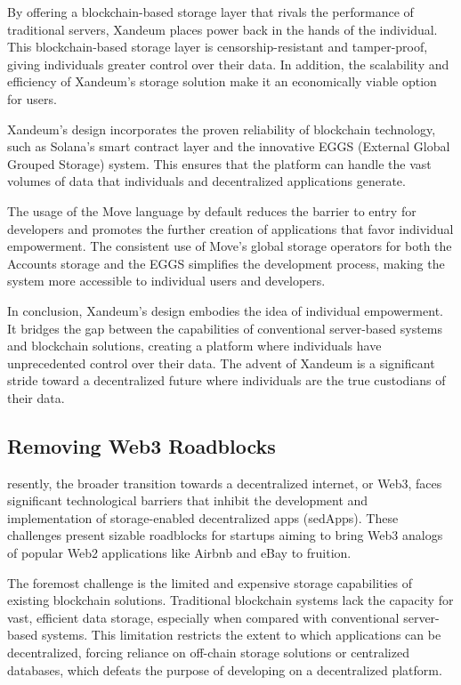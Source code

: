 \documentclass[11pt]{article}   	%
\begin{document}
By offering a blockchain-based storage layer that rivals the performance of traditional servers, Xandeum places power back in the hands of the individual. This blockchain-based storage layer is censorship-resistant and tamper-proof, giving individuals greater control over their data. In addition, the scalability and efficiency of Xandeum's storage solution make it an economically viable option for users.

Xandeum's design incorporates the proven reliability of blockchain technology, such as Solana's smart contract layer and the innovative EGGS (External Global Grouped Storage) system. This ensures that the platform can handle the vast volumes of data that individuals and decentralized applications generate.

The usage of the Move language by default reduces the barrier to entry for developers and promotes the further creation of applications that favor individual empowerment. The consistent use of Move's global storage operators for both the Accounts storage and the EGGS simplifies the development process, making the system more accessible to individual users and developers.

In conclusion, Xandeum's design embodies the idea of individual empowerment. It bridges the gap between the capabilities of conventional server-based systems and blockchain solutions, creating a platform where individuals have unprecedented control over their data. The advent of Xandeum is a significant stride toward a decentralized future where individuals are the true custodians of their data.

\subsection{Removing Web3 Roadblocks}
resently, the broader transition towards a decentralized internet, or Web3, faces significant technological barriers that inhibit the development and implementation of storage-enabled decentralized apps (sedApps). These challenges present sizable roadblocks for startups aiming to bring Web3 analogs of popular Web2 applications like Airbnb and eBay to fruition.

The foremost challenge is the limited and expensive storage capabilities of existing blockchain solutions. Traditional blockchain systems lack the capacity for vast, efficient data storage, especially when compared with conventional server-based systems. This limitation restricts the extent to which applications can be decentralized, forcing reliance on off-chain storage solutions or centralized databases, which defeats the purpose of developing on a decentralized platform.
\end{document}
